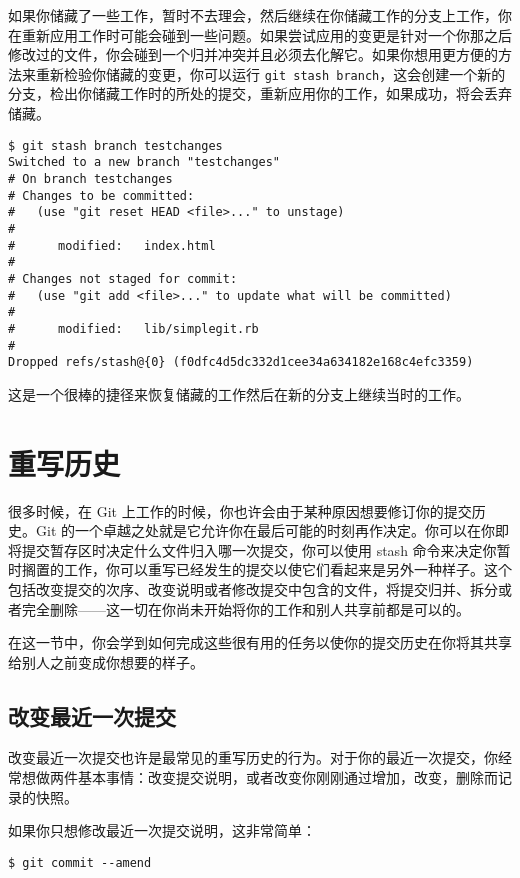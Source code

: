 \documentclass[a4paper]{book}
\begin{document}
如果你储藏了一些工作，暂时不去理会，然后继续在你储藏工作的分支上工作，你在重新应用工作时可能会碰到一些问题。如果尝试应用的变更是针对一个你那之后修改过的文件，你会碰到一个归并冲突并且必须去化解它。如果你想用更方便的方法来重新检验你储藏的变更，你可以运行 \texttt{git stash branch}，这会创建一个新的分支，检出你储藏工作时的所处的提交，重新应用你的工作，如果成功，将会丢弃储藏。

\begin{shaded}\begin{verbatim}
$ git stash branch testchanges
Switched to a new branch "testchanges"
# On branch testchanges
# Changes to be committed:
#   (use "git reset HEAD <file>..." to unstage)
#
#      modified:   index.html
#
# Changes not staged for commit:
#   (use "git add <file>..." to update what will be committed)
#
#      modified:   lib/simplegit.rb
#
Dropped refs/stash@{0} (f0dfc4d5dc332d1cee34a634182e168c4efc3359)
\end{verbatim}\end{shaded}

这是一个很棒的捷径来恢复储藏的工作然后在新的分支上继续当时的工作。

\section{重写历史}

很多时候，在 Git 上工作的时候，你也许会由于某种原因想要修订你的提交历史。Git 的一个卓越之处就是它允许你在最后可能的时刻再作决定。你可以在你即将提交暂存区时决定什么文件归入哪一次提交，你可以使用 stash 命令来决定你暂时搁置的工作，你可以重写已经发生的提交以使它们看起来是另外一种样子。这个包括改变提交的次序、改变说明或者修改提交中包含的文件，将提交归并、拆分或者完全删除------这一切在你尚未开始将你的工作和别人共享前都是可以的。

在这一节中，你会学到如何完成这些很有用的任务以使你的提交历史在你将其共享给别人之前变成你想要的样子。

\subsection{改变最近一次提交}

改变最近一次提交也许是最常见的重写历史的行为。对于你的最近一次提交，你经常想做两件基本事情：改变提交说明，或者改变你刚刚通过增加，改变，删除而记录的快照。

如果你只想修改最近一次提交说明，这非常简单：

\begin{shaded}\begin{verbatim}
$ git commit --amend
\end{verbatim}\end{shaded}
\end{document}
